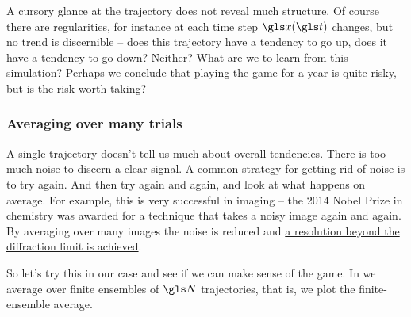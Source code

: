 A cursory glance at the trajectory does not reveal much structure. 
Of course there are regularities, for instance at each time step 
$\x(\t)$ changes, but no trend is discernible -- does this trajectory 
have a tendency to go up, does it have a tendency to go down? 
Neither? What are we to learn from this simulation? Perhaps we 
conclude that playing the game for a year is quite risky, but is the 
risk worth taking? 

\subsubsection{Averaging over many trials}
A single trajectory doesn't tell us much about overall tendencies.
There is too much noise to discern a clear signal. A common 
strategy for getting rid of noise is to try again. And then try again and
again, and look at what happens on average. For example, this is 
very successful in imaging -- the 2014 Nobel Prize in chemistry 
was awarded for a technique that takes a noisy image again and 
again. By averaging over many images the noise is reduced and 
\href{https://en.wikipedia.org/wiki/Super-resolution_microscopy#Stochastic_functional_techniques}{a resolution beyond the diffraction limit is achieved}.

So let's try this in our case and see if we can make sense of the game.
In  we average over finite ensembles of $\N$ 
trajectories, that is, we plot the finite-ensemble average.

